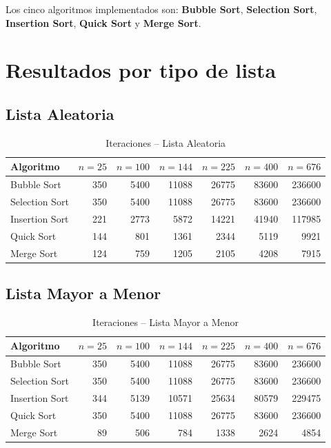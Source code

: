 \documentclass[12pt]{article}
\begin{document}
Los cinco algoritmos implementados son: \textbf{Bubble Sort}, \textbf{Selection Sort}, \textbf{Insertion Sort}, \textbf{Quick Sort} y \textbf{Merge Sort}.

\section*{Resultados por tipo de lista}

\subsection*{Lista Aleatoria}

\begin{table}[H]
\centering
\caption{Iteraciones -- Lista Aleatoria}
\begin{tabular}{lrrrrrr}
\toprule
\textbf{Algoritmo} & \textbf{$n=25$} & \textbf{$n=100$} & \textbf{$n=144$} & \textbf{$n=225$} & \textbf{$n=400$} & \textbf{$n=676$} \\
\midrule
Bubble Sort    & 350  & 5400  & 11088 & 26775 & 83600  & 236600 \\
Selection Sort & 350  & 5400  & 11088 & 26775 & 83600  & 236600 \\
Insertion Sort & 221  & 2773  & 5872  & 14221 & 41940  & 117985 \\
Quick Sort     & 144  & 801   & 1361  & 2344  & 5119   & 9921   \\
Merge Sort     & 124  & 759   & 1205  & 2105  & 4208   & 7915   \\
\bottomrule
\end{tabular}
\end{table}

\subsection*{Lista Mayor a Menor}

\begin{table}[H]
\centering
\caption{Iteraciones -- Lista Mayor a Menor}
\begin{tabular}{lrrrrrr}
\toprule
\textbf{Algoritmo} & \textbf{$n=25$} & \textbf{$n=100$} & \textbf{$n=144$} & \textbf{$n=225$} & \textbf{$n=400$} & \textbf{$n=676$} \\
\midrule
Bubble Sort    & 350  & 5400  & 11088 & 26775 & 83600  & 236600 \\
Selection Sort & 350  & 5400  & 11088 & 26775 & 83600  & 236600 \\
Insertion Sort & 344  & 5139  & 10571 & 25634 & 80579  & 229475 \\
Quick Sort     & 350  & 5400  & 11088 & 26775 & 83600  & 236600 \\
Merge Sort     & 89   & 506   & 784   & 1338  & 2624   & 4854   \\
\bottomrule
\end{tabular}
\end{table}
\end{document}
